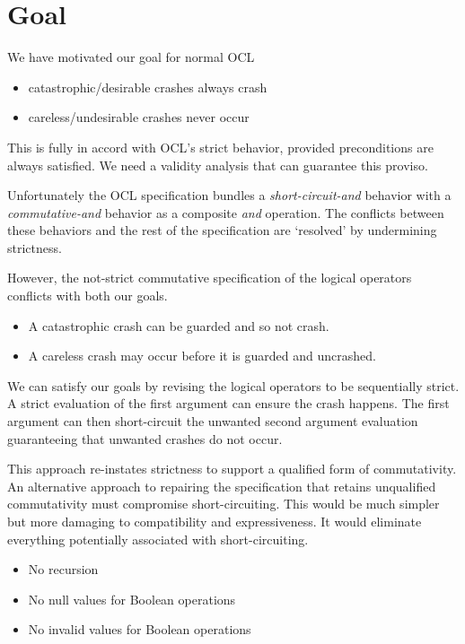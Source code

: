 \documentclass[
]{ceurart}
\begin{document}
\section{Goal}\label{Goal}

We have motivated our goal for normal OCL
\begin{itemize}
	\item catastrophic/desirable crashes always crash
	\item careless/undesirable crashes never occur
\end{itemize}

This is fully in accord with OCL's strict behavior, provided preconditions are always satisfied. We need a validity analysis that can guarantee this proviso.

Unfortunately the OCL specification bundles a \emph{short-circuit-and} behavior with a \emph{commutative-and} behavior as a composite \emph{and} operation. The conflicts between these behaviors and the rest of the specification are `resolved' by undermining strictness.

However, the not-strict commutative specification of the logical operators conflicts with both our goals. 
\begin{itemize}
	\item A catastrophic crash can be guarded and so not crash.
	\item A careless crash may occur before it is guarded and uncrashed.
\end{itemize} 

We can satisfy our goals by revising the logical operators to be sequentially strict. A strict evaluation of the first argument can ensure the crash happens. The first argument can then short-circuit the unwanted second argument evaluation guaranteeing that unwanted crashes do not occur.

This approach re-instates strictness to support a qualified form of commutativity. An alternative approach to repairing the specification that retains unqualified commutativity must compromise short-circuiting. This would be much simpler but more damaging to compatibility and expressiveness. It would eliminate everything potentially associated with short-circuiting.

\begin{itemize}
	\item No recursion
	\item No null values for Boolean operations
	\item No invalid values for Boolean operations	
\end{itemize} 
\end{document}
